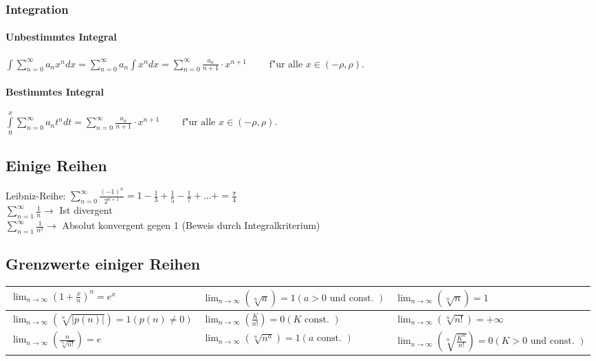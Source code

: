 \subsubsection{Integration}
 \paragraph{Unbestimmtes Integral}
$\int \sum\limits_{n=0}^{\infty} a_n x^n dx = 
\sum\limits_{n=0}^{\infty} a_n \int x^n dx = 
\sum\limits_{n=0}^{\infty} \frac{a_n}{n+1}\cdot x^{n+1} \qquad \text{ f"ur alle } x \in (-\rho, \rho).$
\paragraph{Bestimmtes Integral}
$\int\limits_0^x \sum\limits_{n=0}^{\infty} a_n t^n dt = 
\sum\limits_{n=0}^{\infty} \frac{a_n}{n+1}\cdot x^{n+1} \qquad \text{ f"ur alle } x \in (-\rho, \rho).$\\

\subsection{Einige Reihen}
Leibniz-Reihe: $\sum_{n=0}^{\infty}\frac{(-1)^{n}}{2^{n+1}}=1-\frac{1}{3}+\frac{1}{5}-\frac{1}{7}+\ldots+=\frac{\pi}{4}$\\
\newline
$\sum_{n=1}^{\infty} \frac{1}{n} \rightarrow$ Ist divergent\\
\newline
$\sum_{n=1}^{\infty} \frac{1}{n^{2}} \rightarrow$ Absolut konvergent gegen 1 (Beweis durch Integralkriterium)\\

\subsection{Grenzwerte einiger Reihen}
\renewcommand{\arraystretch}{1.75}
\begin{tabular}{|p{5.1cm}|p{5.7cm}|p{6.7cm}|}
	\hline
	$\lim _{n \rightarrow \infty}\left(1+\frac{x}{n}\right)^{n}=e^{x}$ &
	$\lim _{n \rightarrow \infty}(\sqrt[n]{a})=1(a>0 \text { und const. })$ &
	$\lim _{n \rightarrow \infty}(\sqrt[n]{n})=1$\\
	\hline
	$\lim _{n \rightarrow \infty}(\sqrt[n]{|p(n)|})=1(p(n) \neq 0)$ & 
	$\lim _{n \rightarrow \infty}\left(\frac{K}{n !}\right)=0(K \text { const. })$ &
	$\lim _{n \rightarrow \infty}(\sqrt[n]{n !})=+\infty$\\
	\hline
	$\lim _{n \rightarrow \infty}\left(\frac{n}{\sqrt[n]{n !}}\right)=e$ &
	$\lim _{n \rightarrow \infty}\left(\sqrt[n]{n^{a}}\right)=1(a \text { const. })$ &
	$\lim _{n \rightarrow \infty}\left(\sqrt[n]{\frac{K^{n}}{n !}}\right)=0(K>0 \text { und const. })$\\
	\hline	
\end{tabular}

